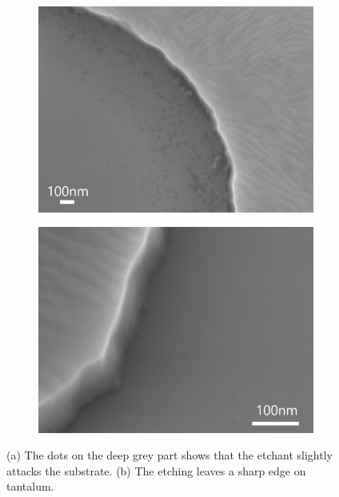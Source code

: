 \begin{figure}[h!]
    \centering
    \begin{subfigure}[b]{0.47\textwidth}
         \centering
         \includegraphics[width=\textwidth]{Pic/TaEtch_0.jpg}
         \caption{}
         \label{halfetchgate}
     \end{subfigure}
     \hfill
     \begin{subfigure}[b]{0.47\textwidth}
         \centering
         \includegraphics[width=\textwidth]{Pic/TaEtch.jpg}
         \caption{}
         \label{fig:three sin x}
     \end{subfigure}
    \caption{(a) The dots on the deep grey part shows that the etchant slightly attacks the substrate. (b) The etching leaves a sharp edge on tantalum.}
    \label{ALDgate}
\end{figure}

